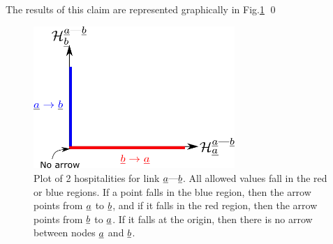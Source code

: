 \documentclass[12pt]{article}
\newcommand{\linkab }[0]{{\rva\text{---}\rvb}}
\begin{document}
The results of this claim
are represented graphically in 
Fig.\ref{fig-hospitalities-x-y}
\qed
\begin{figure}[h!]
\centering
\includegraphics[width=3in]
{hospitalities-x-y.png}
\caption{Plot of 2 hospitalities 
for link $\linkab$.
All allowed values 
fall in the
red or blue regions.
If a point falls in
the blue region, then the arrow 
points from ${\underline{a}}$ to ${\underline{b}}$,
and if it falls in the red region,
then
the arrow points from ${\underline{b}}$ to ${\underline{a}}$.
If it falls at the origin, then
there is no arrow between 
nodes ${\underline{a}}$ and ${\underline{b}}$. }
\label{fig-hospitalities-x-y}
\end{figure}




\end{document}
